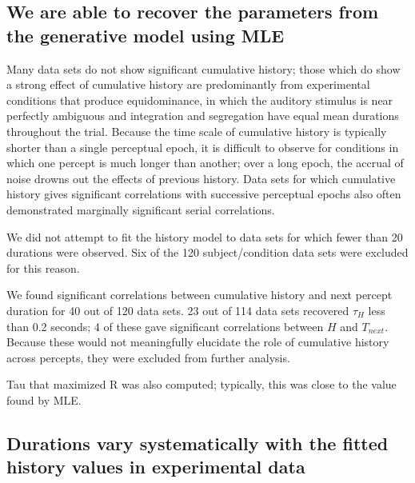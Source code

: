 \subsection{We are able to recover the parameters from the generative model using MLE}

Many data sets do not show significant cumulative history; those which do show a strong effect of cumulative history are predominantly from experimental conditions that produce equidominance, in which the auditory stimulus is near perfectly ambiguous and integration and segregation have equal mean durations throughout the trial. Because the time scale of cumulative history is typically shorter than a single perceptual epoch, it is difficult to observe for conditions in which one percept is much longer than another; over a long epoch, the accrual of noise drowns out the effects of previous history. Data sets for which cumulative history gives significant correlations with successive perceptual epochs also often demonstrated marginally significant serial correlations.

We did not attempt to fit the history model to data sets for which fewer than 20 durations were observed. Six of the 120 subject/condition data sets were excluded for this reason.

We found significant correlations between cumulative history and next percept duration for 40 out of 120 data sets. 23 out of 114 data sets recovered $\tau_{H}$ less than 0.2 seconds; 4 of these gave significant correlations between $H$ and $T_{next}$. Because these would not meaningfully elucidate the role of cumulative history across percepts, they were excluded from further analysis.

Tau that maximized R was also computed; typically, this was close to the value found by MLE. 

\subsection{Durations vary systematically with the fitted history values in experimental data}

